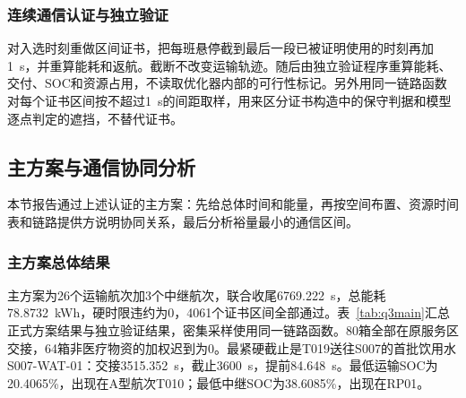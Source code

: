 \begin{table}[H]\centering\scriptsize\caption{已验证联合方案的代表性对比}\label{tab:q3}
\end{table}

\subsubsection{连续通信认证与独立验证}

对入选时刻重做区间证书，把每班悬停截到最后一段已被证明使用的时刻再加1~s，并重算能耗和返航。截断不改变运输轨迹。随后由独立验证程序重算能耗、交付、SOC和资源占用，不读取优化器内部的可行性标记。另外用同一链路函数对每个证书区间按不超过1~s的间距取样，用来区分证书构造中的保守判据和模型逐点判定的遮挡，不替代证书。

\subsection{主方案与通信协同分析}
\label{sec:q3result}

本节报告通过上述认证的主方案：先给总体时间和能量，再按空间布置、资源时间表和链路提供方说明协同关系，最后分析裕量最小的通信区间。

\subsubsection{主方案总体结果}

主方案为26个运输航次加3个中继航次，联合收尾6769.222~s，总能耗78.8732~kWh，硬时限违约为0，4061个证书区间全部通过。表~\ref{tab:q3main}汇总正式方案结果与独立验证结果，密集采样使用同一链路函数。80箱全部在原服务区交接，64箱非医疗物资的加权迟到为0。最紧硬截止是T019送往S007的首批饮用水S007-WAT-01：交接3515.352~s，截止3600~s，提前84.648~s。最低运输SOC为20.4065\%，出现在A型航次T010；最低中继SOC为38.6085\%，出现在RP01。

